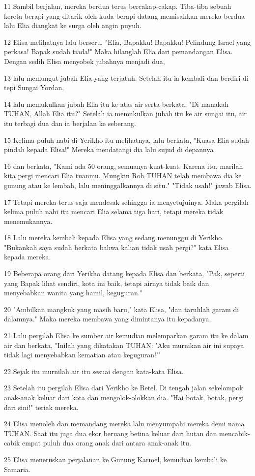 \par 11 Sambil berjalan, mereka berdua terus bercakap-cakap. Tiba-tiba sebuah kereta berapi yang ditarik oleh kuda berapi datang memisahkan mereka berdua lalu Elia diangkat ke surga oleh angin puyuh.
\par 12 Elisa melihatnya lalu berseru, "Elia, Bapakku! Bapakku! Pelindung Israel yang perkasa! Bapak sudah tiada!" Maka hilanglah Elia dari pemandangan Elisa. Dengan sedih Elisa menyobek jubahnya menjadi dua,
\par 13 lalu memungut jubah Elia yang terjatuh. Setelah itu ia kembali dan berdiri di tepi Sungai Yordan,
\par 14 lalu memukulkan jubah Elia itu ke atas air serta berkata, "Di manakah TUHAN, Allah Elia itu?" Setelah ia memukulkan jubah itu ke air sungai itu, air itu terbagi dua dan ia berjalan ke seberang.
\par 15 Kelima puluh nabi di Yerikho itu melihatnya, lalu berkata, "Kuasa Elia sudah pindah kepada Elisa!" Mereka mendatangi dia lalu sujud di depannya
\par 16 dan berkata, "Kami ada 50 orang, semuanya kuat-kuat. Karena itu, marilah kita pergi mencari Elia tuanmu. Mungkin Roh TUHAN telah membawa dia ke gunung atau ke lembah, lalu meninggalkannya di situ." "Tidak usah!" jawab Elisa.
\par 17 Tetapi mereka terus saja mendesak sehingga ia menyetujuinya. Maka pergilah kelima puluh nabi itu mencari Elia selama tiga hari, tetapi mereka tidak menemukannya.
\par 18 Lalu mereka kembali kepada Elisa yang sedang menunggu di Yerikho. "Bukankah saya sudah berkata bahwa kalian tidak usah pergi?" kata Elisa kepada mereka.
\par 19 Beberapa orang dari Yerikho datang kepada Elisa dan berkata, "Pak, seperti yang Bapak lihat sendiri, kota ini baik, tetapi airnya tidak baik dan menyebabkan wanita yang hamil, keguguran."
\par 20 "Ambilkan mangkuk yang masih baru," kata Elisa, "dan taruhlah garam di dalamnya." Maka mereka membawa yang dimintanya itu kepadanya.
\par 21 Lalu pergilah Elisa ke sumber air kemudian melemparkan garam itu ke dalam air dan berkata, "Inilah yang dikatakan TUHAN: 'Aku murnikan air ini supaya tidak lagi menyebabkan kematian atau keguguran!'"
\par 22 Sejak itu murnilah air itu sesuai dengan kata-kata Elisa.
\par 23 Setelah itu pergilah Elisa dari Yerikho ke Betel. Di tengah jalan sekelompok anak-anak keluar dari kota dan mengolok-olokkan dia. "Hai botak, botak, pergi dari sini!" teriak mereka.
\par 24 Elisa menoleh dan memandang mereka lalu menyumpahi mereka demi nama TUHAN. Saat itu juga dua ekor beruang betina keluar dari hutan dan mencabik-cabik empat puluh dua orang anak dari antara anak-anak itu.
\par 25 Elisa meneruskan perjalanan ke Gunung Karmel, kemudian kembali ke Samaria.

